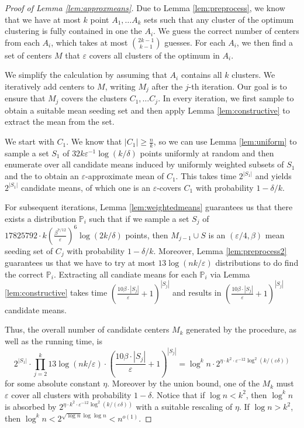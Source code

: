 \documentclass[10pt,a4paper]{amsart}
\begin{document}
\begin{proof}[Proof of Lemma \ref{lem:approxmeans}]
Due to Lemma \ref{lem:preprocess}, we know that we have at most $k$ point $A_1,\ldots A_k$ sets such that any cluster of the optimum clustering is fully contained in one the $A_i$.
We guess the correct number of centers from each $A_i$, which takes at most ${2k-1 \choose k-1}$ guesses.
For each $A_i$, we then find a set of centers $M$ that $\varepsilon$ covers all clusters of the optimum in $A_i$.

We simplify the calculation by assuming that $A_i$ contains all $k$ clusters.
We iteratively add centers to $M$, writing $M_j$ after the $j$-th iteration. Our goal is to ensure that $M_j$ covers the clusters $C_1,\ldots C_j$.
In every iteration, we first sample to obtain a suitable mean seeding set and then apply Lemma \ref{lem:constructive} to extract the mean from the set.

We start with $C_1$. We know that $|C_1|\geq \frac{n}{k}$, so we can use Lemma \ref{lem:uniform} to sample a set $S_1$ of $32 k\varepsilon^{-1}\log(k/\delta)$ points uniformly at random and then enumerate over all candidate means induced by uniformly weighted subsets of $S_1$ and the to obtain an $\varepsilon$-approximate mean of $C_1$. This takes time $2^{|S_1|}$  and yields $2^{|S_1|}$ candidate means, of which one is an $\varepsilon$-covers $C_1$ with probability $1-\delta/k$.

For subsequent iterations, Lemma \ref{lem:weightedmeans} guarantees us that there exists a distribution $\mathbb{P}_i$ such that if we sample a set $S_j$ of $17825792 \cdot k\left(\frac{\beta^{7/12}}{\varepsilon}\right)^6 \log(2k/\delta)$ points, then $M_{j-1}\cup S$ is an $(\varepsilon/4,\beta)$ mean seeding set of $C_j$ with probability $1-\delta/k$. Moreover, Lemma \ref{lem:preprocess2} guarantees us that we have to try at most $13\log(nk/\varepsilon)$ distributions to do find the correct $\mathbb{P}_i$.
Extracting all candiate means for each $\mathbb{P}_i$ via Lemma \ref{lem:constructive} takes time $\left(\frac{10\beta\cdot |S_j|}{\varepsilon}+1\right)^{|S_j|}$ and results in $\left(\frac{10\beta\cdot |S_j|}{\varepsilon}+1\right)^{|S_j|}$ candidate means.

Thus, the overall number of candidate centers $M_k$ generated by the procedure, as well as the running time, is
$$2^{|S_1|}\cdot \prod_{j=2}^k 13\log(nk/\varepsilon) \cdot \left(\frac{10\beta\cdot |S_j|}{\varepsilon}+1\right)^{|S_j|} = \log^k n \cdot 2^{\eta\cdot k^2 \cdot \varepsilon^{-12} \log^2(k/(\varepsilon\delta))}$$
for some absolute constant $\eta$.
Moreover by the union bound, one of the $M_k$ must $\varepsilon$ cover all clusters with probability $1-\delta$.
Notice that if $\log n < k^2$, then $\log^k n$ is absorbed by $2^{\eta\cdot k^2 \cdot \varepsilon^{-12} \log^2(k/(\varepsilon\delta))}$ with a suitable rescaling of $\eta$. If $\log n>k^2$, then $\log^k n <2^{\sqrt{\log n}\log\log n}<n^{o(1)}$.


\end{proof}
\end{document}
